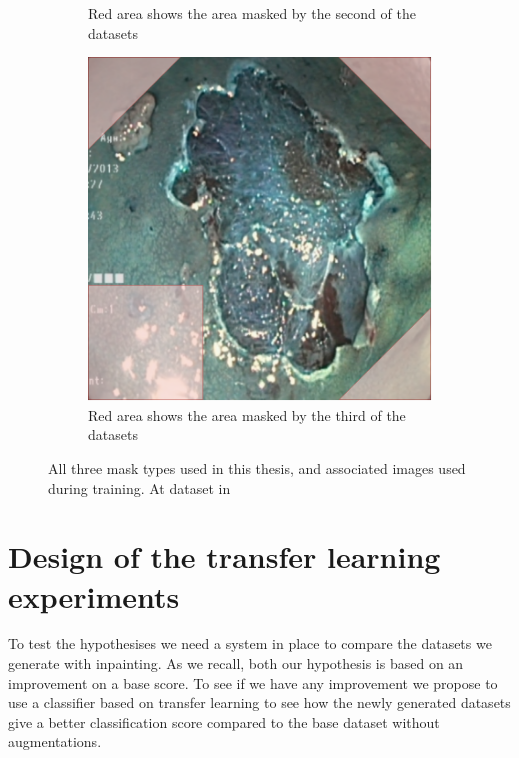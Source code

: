 \begin{figure}
\begin{subfigure}[t]{0.4\textwidth}
         \caption{Red area shows the area masked by the second of the datasets}
         \label{fig:GreenMask}
     \end{subfigure}     
     \hfill
     \begin{subfigure}[t]{0.4\textwidth}
         \centering
         \includegraphics[width=\textwidth]{methodology/figures/bothmask.png}
         \caption{Red area shows the area masked by the third of the datasets}
         \label{fig:BothMask}
     \end{subfigure}
     \caption{All three mask types used in this thesis, and associated images used during training. At dataset in}
     \label{fig:masks}
\end{figure}



\FloatBarrier
\section{Design of the transfer learning experiments}
\label{cha:classifier}
To test the hypothesises we need a system in place to compare the datasets we generate with inpainting. As we recall, both our hypothesis is based on an improvement on a base score. 
To see if we have any improvement we propose to use a classifier based on transfer learning to see how the newly generated datasets give a better classification score compared to the base dataset without augmentations.

